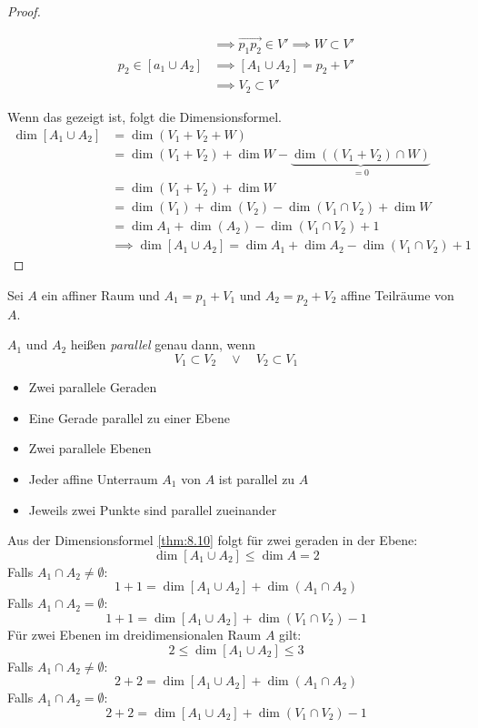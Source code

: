 \documentclass[a4paper, 10pt]{scrbook}
\begin{document}
\begin{thm}
\begin{proof}
\begin{enumerate}
\begin{align*}
&\implies \vec{p_1p_2}\in V'\implies W\subset V'\\
p_2\in[a_1\cup A_2]&\implies [A_1\cup A_2]=p_2+V'\\ &\implies V_2\subset V'
\end{align*}
\end{enumerate}
Wenn das gezeigt ist, folgt die Dimensionsformel.
\begin{align*}
\dim[A_1\cup A_2]&=\dim (V_1+V_2+W)\\
&=\dim(V_1+V_2)+\dim W -\underbrace{\dim((V_1+V_2)\cap W)}_{=0}\\
&=\dim(V_1+V_2)+\dim W \\
&=\dim(V_1) +\dim(V_2)-\dim(V_1\cap V_2)+\dim W\\
&=\dim{A_1}+\dim(A_2)-\dim(V_1\cap V_2) +1\\
&\implies \dim[A_1\cup A_2]=\dim A_1+\dim A_2-\dim(V_1\cap V_2)+1
\end{align*}
\end{proof}
\end{thm}

\begin{df} \label{df:8.11}
Sei $A$ ein affiner Raum und $A_1=p_1+V_1$ und $A_2=p_2+V_2$ affine Teilräume von $A$.

$A_1$ und $A_2$ heißen \emph{parallel} genau dann, wenn 
\[
	V_1\subset V_2 \quad \lor \quad V_2 \subset V_1
\]
\begin{ex}
\begin{itemize}
\item Zwei parallele Geraden
\item Eine Gerade parallel zu einer Ebene
\item Zwei parallele Ebenen
\item Jeder affine Unterraum $A_1$ von $A$ ist parallel zu $A$
\item Jeweils zwei Punkte sind parallel zueinander
\end{itemize}
\end{ex}
\end{df}

Aus der Dimensionsformel \ref{thm:8.10} folgt für zwei geraden in der Ebene:
\[ \dim[A_1\cup A_2]\le \dim A = 2\]
Falls $A_1\cap A_2\neq \emptyset$:
\[ 1+1 = \dim[A_1\cup A_2]+\dim(A_1\cap A_2)\]
Falls $A_1\cap A_2=\emptyset$:
\[ 1+1=\dim[A_1\cup A_2]+\dim(V_1\cap V_2)-1\]
Für zwei Ebenen im dreidimensionalen Raum $A$ gilt:
\[  2\le\dim[A_1\cup A_2]\le3\]
Falls $A_1\cap A_2\neq\emptyset$:
\[ 2+2=\dim[A_1\cup A_2]+\dim(A_1\cap A_2)\]
Falls $A_1\cap A_2=\emptyset$:
\[ 2+2=\dim[A_1\cup A_2]+\dim(V_1\cap V_2)-1\]
\end{document}
